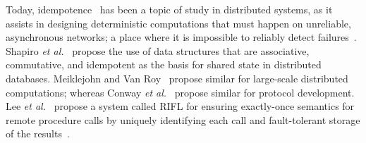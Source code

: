 Today, idempotence~\cite{Helland:2012:IMC:2181796.2187821} has been a topic of study in distributed systems, as it assists in designing deterministic computations that must happen on unreliable, asynchronous networks; a place where it is impossible to reliably detect failures~\cite{fischer1985impossibility}.  Shapiro \textit{et al.}~\cite{shapiro2011comprehensive} propose the use of data structures that are associative, commutative, and idempotent as the basis for shared state in distributed databases.  Meiklejohn and Van Roy~\cite{meiklejohn2015lasp} propose similar for large-scale distributed computations; whereas Conway \textit{et al.}~\cite{conway2012logic} propose similar for protocol development.  Lee \textit{et al.}~ propose a system called RIFL for ensuring exactly-once semantics for remote procedure calls by uniquely identifying each call and fault-tolerant storage of the results~\cite{lee2015implementing}.